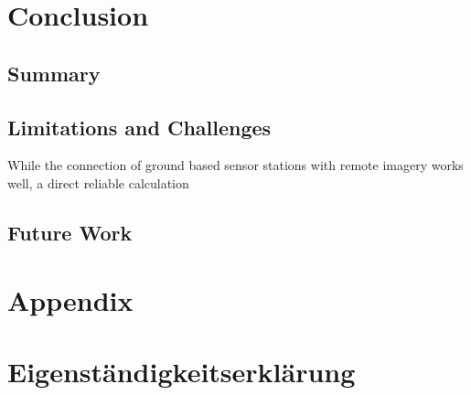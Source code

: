 \documentclass[12pt,a4paper, english]{article}
\begin{document}
%
\section{Conclusion}\label{sec:conclusion}
\subsection{Summary}

\subsection{Limitations and Challenges}
While the connection of ground based sensor stations with remote imagery works well, a direct reliable calculation 
% 
\subsection{Future Work}

\newpage
\section{Appendix}
%
%
\newpage
\printbibliography%
\newpage
\section*{Eigenständigkeitserklärung}

\end{document}
